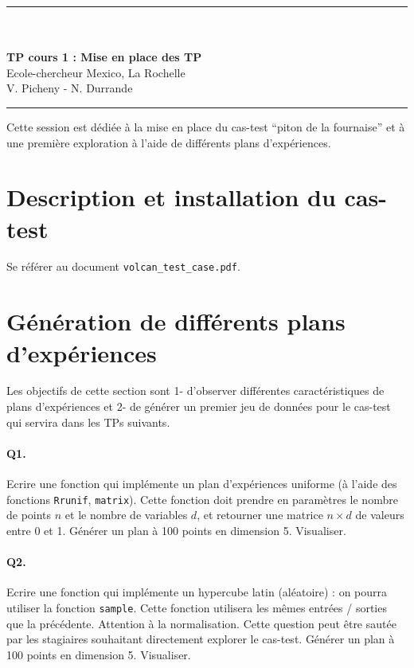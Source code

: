 \documentclass[12pt]{scrartcl}
\newcommand{\R}{\texttt{R}}
\begin{document}
\begin{center}
	\rule{\textwidth}{1pt}
	\\ \ \\
	{\LARGE \textbf{TP cours 1 : Mise en place des TP}}\\
	\vspace{3mm}
	{\large Ecole-chercheur Mexico, La Rochelle \\ \vspace{3mm}}
	{\normalsize V. Picheny - N. Durrande}\\
	\vspace{3mm}
	\rule{\textwidth}{1pt}
	\vspace{5mm}
\end{center}
Cette session est dédiée à la mise en place du cas-test ``piton de la fournaise'' et à une première exploration à l'aide de différents plans d'expériences.

\section{Description et installation du cas-test}
Se référer au document \texttt{volcan\_test\_case.pdf}.

\section{Génération de différents plans d'expériences}

Les objectifs de cette section sont 1- d'observer différentes caractéristiques de plans d'expériences et 2- de générer un premier jeu de données pour le cas-test qui servira dans les TPs suivants.

\paragraph{Q1.} Ecrire une fonction qui implémente un plan d'expériences uniforme (à l'aide des fonctions \R \texttt{runif}, \texttt{matrix}). 
Cette fonction doit prendre en paramètres le nombre de points $n$ et le nombre de variables $d$, et retourner une matrice $n \times d$ de valeurs entre 0 et 1. Générer un plan à 100 points en dimension 5. Visualiser.

\paragraph{Q2.} Ecrire une fonction qui implémente un hypercube latin (aléatoire) : on pourra utiliser la fonction \texttt{sample}. Cette fonction utilisera les mêmes entrées / sorties que la précédente.
Attention à la normalisation. Cette question peut être sautée par les stagiaires souhaitant directement explorer le cas-test. Générer un plan à 100 points en dimension 5. Visualiser.
\end{document}
